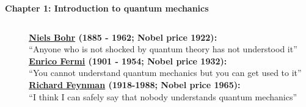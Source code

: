\renewcommand{\theequation}{1.\arabic{equation}}

\begin{frame}
\begin{center}
{\bf Chapter 1: Introduction to quantum mechanics}\\
\end{center}

\scriptsize

\begin{columns}
\begin{column}{2cm}


\end{column}
\begin{column}{8cm}
\textbf{\href{http://en.wikipedia.org/wiki/Niels_Bohr}{\underline{Niels Bohr}} (1885 - 1962; Nobel price 1922):}\\
``Anyone who is not shocked by quantum theory has not understood it''\\
\vspace*{1.5cm}
\textbf{\href{http://en.wikipedia.org/wiki/Enrico_Fermi}{\underline{Enrico Fermi}} (1901 - 1954; Nobel price 1932):}\\
``You cannot understand quantum mechanics but you can get used to it''\\
\vspace*{1.5cm}
\textbf{\href{http://en.wikipedia.org/wiki/Richard_Feynman}{\underline{Richard Feynman}} (1918-1988; Nobel price 1965):}\\
``I think I can safely say that nobody understands quantum mechanics''\\

\end{column}
\end{columns}
\end{frame}

\scriptsize















